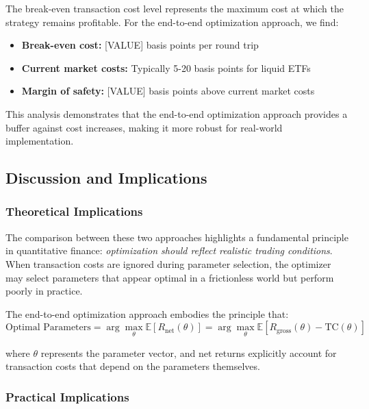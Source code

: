 The break-even transaction cost level represents the maximum cost at which the strategy remains profitable. For the end-to-end optimization approach, we find:

\begin{itemize}
    \item \textbf{Break-even cost:} [VALUE] basis points per round trip
    \item \textbf{Current market costs:} Typically 5-20 basis points for liquid ETFs
    \item \textbf{Margin of safety:} [VALUE] basis points above current market costs
\end{itemize}

This analysis demonstrates that the end-to-end optimization approach provides a buffer against cost increases, making it more robust for real-world implementation.


\subsection{Discussion and Implications}

\subsubsection{Theoretical Implications}

The comparison between these two approaches highlights a fundamental principle in quantitative finance: \textit{optimization should reflect realistic trading conditions}. When transaction costs are ignored during parameter selection, the optimizer may select parameters that appear optimal in a frictionless world but perform poorly in practice.

The end-to-end optimization approach embodies the principle that:
\begin{equation}
\text{Optimal Parameters} = \arg\max_{\theta} \mathbb{E}[R_{\text{net}}(\theta)] = \arg\max_{\theta} \mathbb{E}[R_{\text{gross}}(\theta) - \text{TC}(\theta)]
\end{equation}

where $\theta$ represents the parameter vector, and net returns explicitly account for transaction costs that depend on the parameters themselves.

\subsubsection{Practical Implications}

